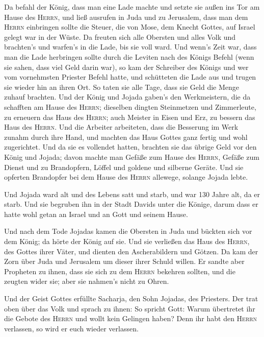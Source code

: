  Da befahl der König, dass man eine Lade machte und setzte
sie außen ins Tor am Hause des \textsc{Herrn},  und ließ
ausrufen in Juda und zu Jerusalem, dass man dem \textsc{Herrn}
einbringen sollte die Steuer, die von Mose, dem Knecht Gottes, auf
Israel gelegt war in der Wüste.  Da freuten sich alle
Obersten und alles Volk und brachten's und warfen's in die Lade, bis sie
voll ward.  Und wenn's Zeit war, dass man die Lade
herbringen sollte durch die Leviten nach des Königs Befehl (wenn sie
sahen, dass viel Geld darin war), so kam der Schreiber des Königs und
wer vom vornehmsten Priester Befehl hatte, und schütteten die Lade aus
und trugen sie wieder hin an ihren Ort. So taten sie alle Tage, dass sie
Geld die Menge zuhauf brachten.  Und der König und Jojada
gaben's den Werkmeistern, die da schafften am Hause des \textsc{Herrn};
dieselben dingten Steinmetzen und Zimmerleute, zu erneuern das Haus des
\textsc{Herrn}; auch Meister in Eisen und Erz, zu bessern das Haus des
\textsc{Herrn}.  Und die Arbeiter arbeiteten, dass die
Besserung im Werk zunahm durch ihre Hand, und machten das Haus Gottes
ganz fertig und wohl zugerichtet.  Und da sie es
vollendet hatten, brachten sie das übrige Geld vor den König und Jojada;
davon machte man Gefäße zum Hause des \textsc{Herrn}, Gefäße zum Dienst
und zu Brandopfern, Löffel und goldene und silberne Geräte. Und sie
opferten Brandopfer bei dem Hause des \textsc{Herrn} allewege, solange
Jojada lebte.

 Und Jojada ward alt und des Lebens satt und starb, und
war 130 Jahre alt, da er starb.  Und sie begruben ihn in
der Stadt Davids unter die Könige, darum dass er hatte wohl getan an
Israel und an Gott und seinem Hause.

 Und nach dem Tode Jojadas kamen die Obersten in Juda und
bückten sich vor dem König; da hörte der König auf sie. 
Und sie verließen das Haus des \textsc{Herrn}, des Gottes ihrer Väter,
und dienten den Ascherabildern und Götzen. Da kam der Zorn über Juda und
Jerusalem um dieser ihrer Schuld willen.  Er sandte aber
Propheten zu ihnen, dass sie sich zu dem \textsc{Herrn} bekehren
sollten, und die zeugten wider sie; aber sie nahmen's nicht zu Ohren.

 Und der Geist Gottes erfüllte Sacharja, den Sohn
Jojadas, des Priesters. Der trat oben über das Volk und sprach zu ihnen:
So spricht Gott: Warum übertretet ihr die Gebote des \textsc{Herrn} und
wollt kein Gelingen haben? Denn ihr habt den \textsc{Herrn} verlassen,
so wird er euch wieder verlassen.

